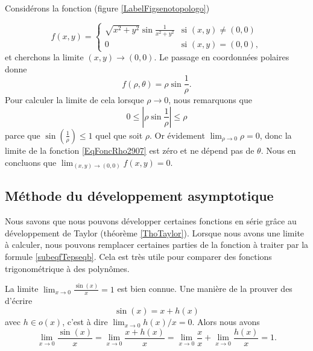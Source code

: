 \begin{example}\label{seno}
	Considérons la fonction (figure \ref{LabelFigsenotopologo})

	\begin{equation}
		f(x,y)=\begin{cases}
			\sqrt{x^2+y^2}\sin\frac{1}{ x^2+y^2 }	&	\text{si $(x,y)\neq(0,0)$}\\
			0	&	 \text{si $(x,y)=(0,0)$},
		\end{cases}
	\end{equation}
	et cherchons la limite $(x,y)\to(0,0)$. Le passage en coordonnées polaires donne
	\begin{equation}		\label{EqFoncRho2907}
		f(\rho,\theta)=\rho\sin\frac{1}{ \rho }.
	\end{equation}
	Pour calculer la limite de cela lorsque $\rho\to 0$, nous remarquons que
	\begin{equation}
		0\leq|\rho\sin\frac{1}{ \rho }|\leq\rho
	\end{equation}
	parce que $\sin(\frac{1}{ \rho })\leq 1$ quel que soit $\rho$. Or évidement $\lim_{\rho\to 0} \rho=0$, donc la limite de la fonction \eqref{EqFoncRho2907} est zéro et ne dépend pas de $\theta$. Nous en concluons que $\lim_{(x,y)\to(0,0)}f(x,y)=0$.
\end{example}
\newcommand{\CaptionFigsenotopologo}{La fonction de l'exemple \ref{seno}.}


\subsection{Méthode du développement asymptotique}

Nous savons que nous pouvons développer certaines fonctions en série grâce au développement de Taylor (théorème \ref{ThoTaylor}). Lorsque nous avons une limite à calculer, nous pouvons remplacer certaines parties de la fonction à traiter par la formule \eqref{subeqfTepseqb}. Cela est très utile pour comparer des fonctions trigonométrique à des polynômes.

\begin{example}		\label{ExamLimSinxxa}
	La limite $\lim_{x\to 0} \frac{ \sin(x) }{ x }=1$ est bien connue. Une manière de la prouver des d'écrire
	\begin{equation}
		\sin(x)=x+h(x)
	\end{equation}
	avec $h\in o(x)$, c'est à dire $\lim_{x\to 0} h(x)/x=0$. Alors nous avons
	\begin{equation}
		\lim_{x\to 0} \frac{ \sin(x) }{ x }=\lim_{x\to 0} \frac{ x+h(x) }{ x }=\lim_{x\to 0} \frac{ x }{ x }+\lim_{x\to 0} \frac{ h(x) }{ x }=1.
	\end{equation}
\end{example}

